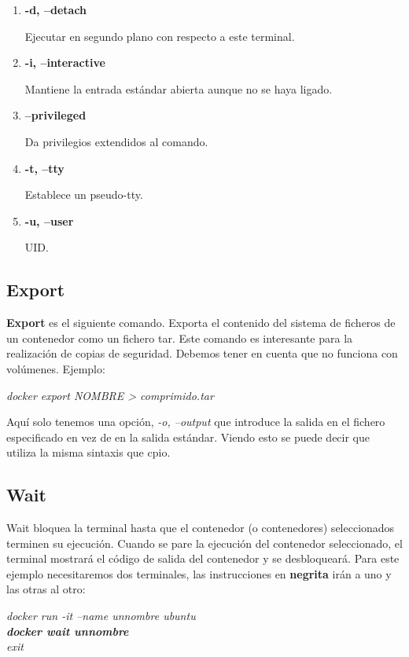\documentclass[]{article}
\begin{document}
\begin{enumerate}
\renewcommand{\labelenumi}{$ \bullet $}
\item {\bf -d, --detach}

Ejecutar en segundo plano con respecto a este terminal.
\item {\bf -i, --interactive}

Mantiene la entrada estándar abierta aunque no se haya ligado.
\item {\bf --privileged}

Da privilegios extendidos al comando.
\item {\bf -t, --tty}

Establece un pseudo-tty.
\item {\bf -u, --user}

UID.

\end{enumerate}

\subsection{Export}
{\bf Export} es el siguiente comando.
Exporta el contenido del sistema de ficheros de un contenedor como un fichero tar.
Este comando es interesante para la realización de copias de seguridad.
Debemos tener en cuenta que no funciona con volúmenes.
Ejemplo:
\begin{center}
	\it
	docker export NOMBRE > comprimido.tar
\end{center}

Aquí solo tenemos una opción, {\it -o, --output} que introduce la salida en el fichero especificado en vez de en la salida estándar.
Viendo esto se puede decir que utiliza la misma sintaxis que cpio.

\subsection{Wait}
Wait bloquea la terminal hasta que el contenedor (o contenedores) seleccionados terminen su ejecución.
Cuando se pare la ejecución del contenedor seleccionado, el terminal mostrará el código de salida del contenedor y se desbloqueará.
Para este ejemplo necesitaremos dos terminales, las instrucciones en {\bf negrita} irán a uno y las otras al otro:
\begin{center}
	\textit{
		docker run -it --name unnombre ubuntu\\
		\textbf{docker wait unnombre}\\
		\it exit
	}
\end{center}
\end{document}
